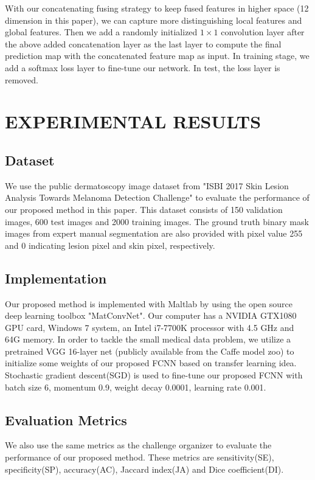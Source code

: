 \documentclass{article}
\begin{document}
With our concatenating fusing strategy to keep fused features in higher space (12 dimension in this paper), we can capture more distinguishing local features and global features. Then we add a randomly initialized $1\times1$ convolution layer after the above added concatenation layer as the last layer to compute the final prediction map with the concatenated feature map as input. In training stage, we add a softmax loss layer to fine-tune our network. In test, the loss layer is removed. 

\section{EXPERIMENTAL RESULTS}
\label{sec:experiment}

\subsection{Dataset}
We use the public dermatoscopy image dataset from  
"ISBI 2017 Skin Lesion Analysis Towards Melanoma Detection Challenge"\cite{2017-ISBI-SkinLesionChallenge} to evaluate the performance of our proposed method in this paper.
This dataset consists of 150 validation images, 600 test images and 2000 training images.
The ground truth binary mask images from expert manual segmentation are also provided  with pixel value 255 and 0 indicating lesion pixel and skin pixel, respectively. 


\subsection{Implementation}
Our proposed method is implemented with Maltlab by using the open source deep learning toolbox  "MatConvNet"\cite{vedaldi15matconvnet}. Our computer has a NVIDIA GTX1080 GPU card, Windows 7 system, an Intel i7-7700K processor with 4.5 GHz and 64G memory.  
In order to tackle the small medical data problem, we utilize a pretrained VGG 16-layer net (publicly available from the Caffe model zoo) to initialize some weights of our proposed FCNN based on transfer learning idea.  
Stochastic gradient descent(SGD) is used to fine-tune our proposed FCNN with batch size 6, momentum 0.9, weight decay 0.0001, learning rate 0.001.  

\subsection{Evaluation Metrics}
We also use the same metrics as the challenge organizer to evaluate the performance of our proposed method. These metrics are sensitivity(SE), specificity(SP), accuracy(AC), Jaccard index(JA) and Dice coefficient(DI). 
\end{document}
